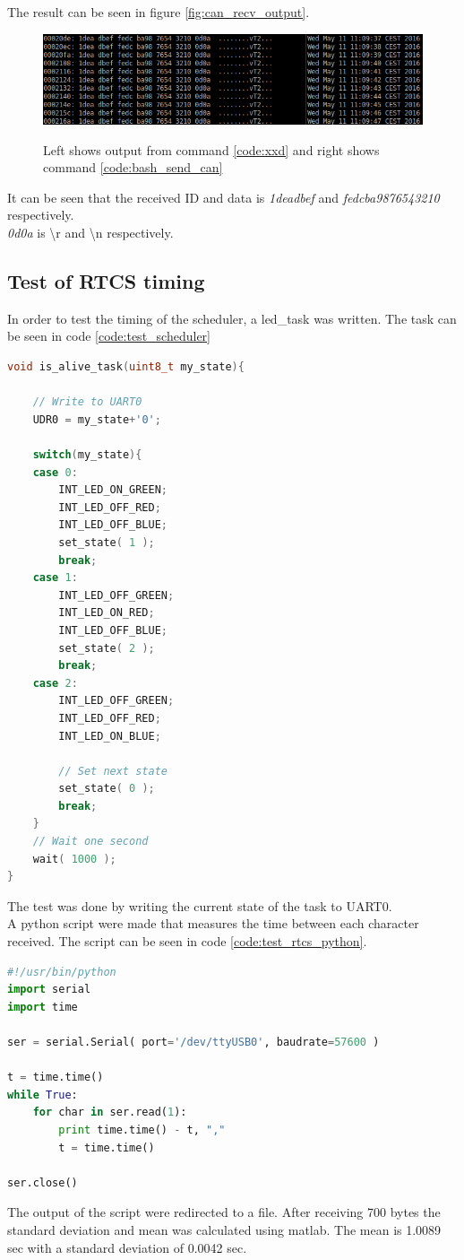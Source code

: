 The result can be seen in figure \ref{fig:can_recv_output}.
\begin{figure}[H]
    \center
    \includegraphics[width=1\textwidth]{graphics/xdd_can_test.png}
  \label{fig:boat1}
  \caption{Left shows output from command \ref{code:xxd} and right shows command \ref{code:bash_send_can}}
\end{figure}
It can be seen that the received ID and data is \textit{1deadbef} and \textit{fedcba9876543210} respectively.\\
\textit{0d0a} is \textbackslash r and \textbackslash n respectively.


\subsection{Test of RTCS timing}
In order to test the timing of the scheduler, a led\_task was written. The task can be seen in code \ref{code:test_scheduler}
\begin{lstlisting}[language = c, caption = RTCS task used in timing test, label=code:test_scheduler]
void is_alive_task(uint8_t my_state){

	// Write to UART0
	UDR0 = my_state+'0';

	switch(my_state){
	case 0:
		INT_LED_ON_GREEN;
		INT_LED_OFF_RED;
		INT_LED_OFF_BLUE;
	    set_state( 1 );
		break;
	case 1:
		INT_LED_OFF_GREEN;
		INT_LED_ON_RED;
		INT_LED_OFF_BLUE;
	    set_state( 2 );
		break;
	case 2:
		INT_LED_OFF_GREEN;
		INT_LED_OFF_RED;
		INT_LED_ON_BLUE;

		// Set next state
	    set_state( 0 );
		break;
	}
	// Wait one second
	wait( 1000 );
}
\end{lstlisting}

The test was done by writing the current state of the task to UART0.\\ A python script were made that measures the time between each character received. The script can be seen in code \ref{code:test_rtcs_python}.
\begin{lstlisting}[language = python, caption = Python code used to measure time between received byte, label=code:test_rtcs_python]
#!/usr/bin/python
import serial
import time

ser = serial.Serial( port='/dev/ttyUSB0', baudrate=57600 )

t = time.time()
while True:
    for char in ser.read(1):
        print time.time() - t, ","
        t = time.time()

ser.close()
\end{lstlisting}
The output of the script were redirected to a file. After receiving 700 bytes the standard deviation and mean was calculated using matlab.
The mean is 1.0089 sec with a standard deviation of 0.0042 sec.

